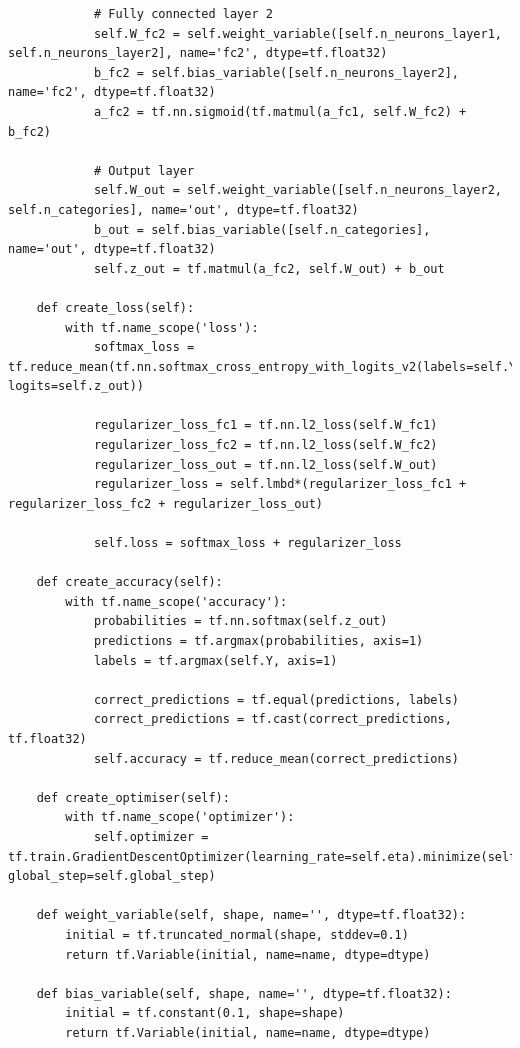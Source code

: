 \documentclass[%
oneside,                 %
final,                   %
10pt]{article}
\begin{document}
\begin{verbatim}
            # Fully connected layer 2
            self.W_fc2 = self.weight_variable([self.n_neurons_layer1, self.n_neurons_layer2], name='fc2', dtype=tf.float32)
            b_fc2 = self.bias_variable([self.n_neurons_layer2], name='fc2', dtype=tf.float32)
            a_fc2 = tf.nn.sigmoid(tf.matmul(a_fc1, self.W_fc2) + b_fc2)
            
            # Output layer
            self.W_out = self.weight_variable([self.n_neurons_layer2, self.n_categories], name='out', dtype=tf.float32)
            b_out = self.bias_variable([self.n_categories], name='out', dtype=tf.float32)
            self.z_out = tf.matmul(a_fc2, self.W_out) + b_out
    
    def create_loss(self):
        with tf.name_scope('loss'):
            softmax_loss = tf.reduce_mean(tf.nn.softmax_cross_entropy_with_logits_v2(labels=self.Y, logits=self.z_out))
            
            regularizer_loss_fc1 = tf.nn.l2_loss(self.W_fc1)
            regularizer_loss_fc2 = tf.nn.l2_loss(self.W_fc2)
            regularizer_loss_out = tf.nn.l2_loss(self.W_out)
            regularizer_loss = self.lmbd*(regularizer_loss_fc1 + regularizer_loss_fc2 + regularizer_loss_out)
            
            self.loss = softmax_loss + regularizer_loss

    def create_accuracy(self):
        with tf.name_scope('accuracy'):
            probabilities = tf.nn.softmax(self.z_out)
            predictions = tf.argmax(probabilities, axis=1)
            labels = tf.argmax(self.Y, axis=1)
            
            correct_predictions = tf.equal(predictions, labels)
            correct_predictions = tf.cast(correct_predictions, tf.float32)
            self.accuracy = tf.reduce_mean(correct_predictions)
    
    def create_optimiser(self):
        with tf.name_scope('optimizer'):
            self.optimizer = tf.train.GradientDescentOptimizer(learning_rate=self.eta).minimize(self.loss, global_step=self.global_step)
            
    def weight_variable(self, shape, name='', dtype=tf.float32):
        initial = tf.truncated_normal(shape, stddev=0.1)
        return tf.Variable(initial, name=name, dtype=dtype)
    
    def bias_variable(self, shape, name='', dtype=tf.float32):
        initial = tf.constant(0.1, shape=shape)
        return tf.Variable(initial, name=name, dtype=dtype)
    

\end{verbatim}
\end{document}
